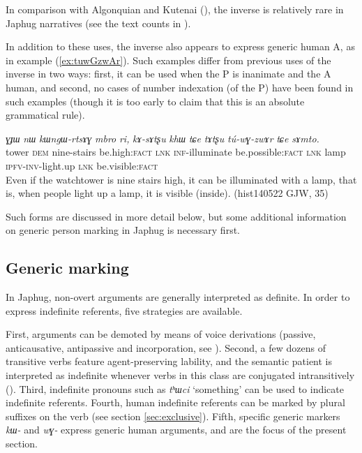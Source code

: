 \documentclass[oneside,a4paper,11pt]{article}
\newcommand{\ipa}[1]{\textit{\phon\mbox{#1}}} %
\newcommand{\refb}[1]{(\ref{#1})}
\begin{document}
In comparison with Algonquian and Kutenai (\citealt{dryer94inverse}), the inverse is relatively rare in Japhug narratives (see the text counts in \citealt{jacques10inverse}).

In addition to these uses, the inverse also appears to express generic human A, as in example \refb{ex:tuwGzwAr}. Such examples differ from previous uses of the inverse in two ways: first, it can be used when the P is inanimate and the A human, and second, no cases of number indexation (of the P) have been found in such examples (though it is too early to claim that this is an absolute grammatical rule). 

\begin{exe}
\ex  \label{ex:tuwGzwAr}
\gll \ipa{ɣɟɯ} 	\ipa{nɯ} 	\ipa{kɯngɯ-rtsɤɣ} 	\ipa{mbro} 	\ipa{ri,} 	\ipa{kɤ-sɤtʂu} 	\ipa{khɯ} 	\ipa{tɕe} 	\ipa{tɤtʂu} 	\ipa{tú-wɣ-zwɤr} 	\ipa{tɕe} 	\ipa{sɤmto.}  \\
tower \textsc{dem} nine-stairs be.high:\textsc{fact} \textsc{lnk} \textsc{inf}-illuminate be.possible:\textsc{fact} \textsc{lnk} lamp \textsc{ipfv-inv}-light.up \textsc{lnk} be.visible:\textsc{fact} \\
\glt Even if the watchtower is nine stairs high, it can be illuminated with a lamp, that is, when people light up a lamp, it is visible (inside). (hist140522 GJW, 35)
\end{exe}

Such forms are discussed in more detail below, but some additional information on generic person marking in Japhug is necessary first.

\subsection{Generic marking}  \label{sec:genr.jpg}

In Japhug, non-overt arguments are generally interpreted as definite. In order to express indefinite referents, five strategies are available. 

First, arguments can be demoted by means of voice derivations (passive, anticausative,  antipassive and incorporation, see \citealt{jacques12incorp, jacques14antipassive}). Second, a few dozens of transitive verbs feature agent-preserving lability, and the semantic patient is interpreted as indefinite whenever verbs in this class are conjugated intransitively (\citealt{jacques12demotion}).  Third, indefinite pronouns such as \ipa{tʰɯci} `something'  can be used to indicate indefinite referents. Fourth, human indefinite referents can be marked by plural suffixes on the verb (see section \ref{sec:exclusive}). Fifth, specific generic markers \ipa{kɯ-} and \ipa{wɣ-} express generic human arguments, and are the focus of the present section. 
\end{document}
